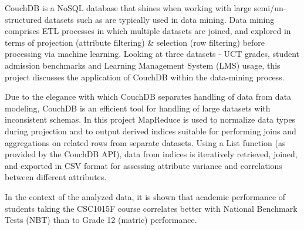 CouchDB is a NoSQL database that shines when working with large semi/un-structured datasets such as are typically used in data mining. Data mining comprises ETL processes in which multiple datasets are joined, and explored in terms of projection (attribute filtering) \& selection (row filtering) before processing via machine learning. Looking at three datasets - UCT grades, student admission benchmarks and Learning Management System (LMS) usage, this project discusses the application of CouchDB within the data-mining process.

Due to the elegance with which CouchDB separates handling of data from data modeling, CouchDB is an efficient tool for handling of large datasets with inconsistent schemas. In this project MapReduce is used to normalize data types during projection and to output derived indices suitable for performing joins and aggregations on related rows from separate datasets. Using a List function (as provided by the CouchDB API), data from indices is iteratively retrieved, joined, and exported in CSV format for assessing attribute variance and correlations between different attributes.

In the context of the analyzed data, it is shown that academic performance of students taking the CSC1015F course correlates better with National Benchmark Tests (NBT) than to Grade 12 (matric) performance.
